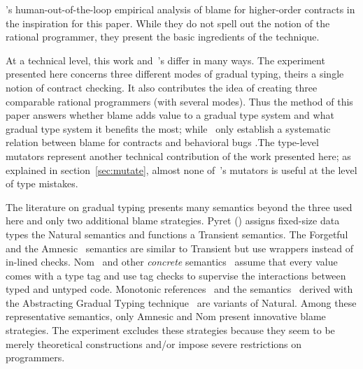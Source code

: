 
\citet{lksfd-popl-2020}'s human-out-of-the-loop empirical analysis of blame for
higher-order contracts in the inspiration for this paper.  While they do not
spell out the notion of the rational programmer, they present the basic
ingredients of the technique.

At a technical level, this work and~\citet{lksfd-popl-2020}'s differ in
many ways. The experiment presented here concerns three different modes of
gradual typing, theirs a single notion of contract checking.  It also
contributes the idea of creating three comparable rational programmers
(with several modes). Thus the method of this paper answers whether blame
adds value to a gradual type system and what gradual type system it
benefits the most; while~\citet{lksfd-popl-2020} only establish a
systematic relation between blame for contracts and behavioral bugs .The
type-level mutators represent another technical contribution of the work
presented here; as explained in section~\ref{sec:mutate}, almost none
of~\citet{lksfd-popl-2020}'s mutators is useful at the level of type
mistakes.

The literature on gradual typing presents many semantics beyond the three used
here and only two additional blame strategies.  Pyret
() assigns fixed-size data types the Natural
semantics and functions a Transient semantics. The Forgetful~\cite{cl-icfp-2017}
and the Amnesic~\cite{gfd-oopsla-2019} semantics are similar to Transient but
use wrappers instead of in-lined checks.  Nom~\cite{mt-oopsla-2017} and other
\emph{concrete\/} semantics~\cite{wnlov-popl-2010, rsfbv-popl-2015,
rzv-ecoop-2015, rat-oopsla-2017} assume that every value comes with a type tag
and use tag checks to supervise the interactions between typed and untyped code.
Monotonic references~\cite{svctg-esop-2015} and the
semantics~\cite{tlt-popl-2019, etg-icfp-19, tt-scp-20, tgt-popl-18, tt-sas-17}
derived with the Abstracting Gradual Typing technique~\cite{gct-popl-2016} are
variants of Natural.  Among these representative semantics, only Amnesic and Nom
present innovative blame strategies.  The experiment excludes these strategies
because they seem to be merely theoretical constructions and/or impose severe
restrictions on programmers.
 
